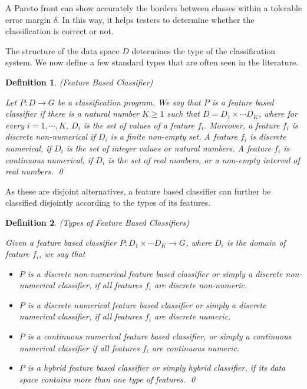 \documentclass[preprint,1p,authoryear,times]{elsarticle}
\newtheorem{Definition}{Definition}
\begin{document}
A Pareto front can show accurately the borders between classes within a tolerable error margin $\delta$. In this way, it helps testers to determine whether the classification is correct or not.

The structure of the data space $D$ determines the type of the classification system. We now define a few standard types that are often seen in the literature.

\begin{Definition} \label{def:FeatureBasedClassifier} (Feature Based Classifier)

Let $P : D \rightarrow G$ be a classification program. We say that $P$ is a \emph{feature based classifier} if there is a natural number $K \geq 1$ such that $D = D_1 \times \cdots D_K$, where for every $i=1, \cdots, K$, $D_i$ is the set of values of a feature $f_i$.  Moreover, a feature $f_i$ is \emph{discrete non-numerical} if $D_i$ is a finite non-empty set. A feature $f_i$ is discrete numerical, if $D_i$ is the set of integer values or natural numbers. A feature $f_i$ is continuous numerical, if $D_i$ is the set of real numbers, or a non-empty interval of real numbers. \qed
\end{Definition}

As these are disjoint alternatives, a feature based classifier can further be classified disjointly according to the types of its features.

\begin{Definition} \label{def:TypesOfFeatureClassifer}(Types of Feature Based Classifiers)

Given a feature based classifier $P: D_1 \times \cdots D_K \rightarrow G$, where $D_i$ is the domain of feature $f_i$, we say that 
\begin{itemize}
\item $P$ is a \emph{discrete non-numerical feature based classifier} or simply a \emph{discrete non-numerical classifier}, if all features $f_i$ are discrete non-numeric. 
\item $P$ is a \emph{discrete numerical feature based classifier} or simply a \emph{discrete numerical classifier}, if all features $f_i$ are discrete numeric. 
\item $P$ is a \emph{continuous numerical feature based classifier}, or simply a \emph{continuous numerical classifier} if all features $f_i$ are continuous numeric. 
\item $P$ is a \emph{hybrid feature based classifier} or simply \emph{hybrid classifier}, if its data space contains more than one type of features. \qed
\end{itemize} 
\end{Definition}
\end{document}
